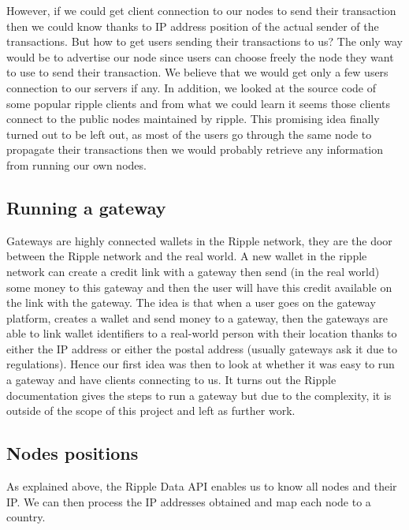 However, if we could get client connection to our nodes to send their transaction then we could know thanks to IP address position of the actual sender of the transactions. But how to get users sending their transactions to us? The only way would be to advertise our node since users can choose freely the node they want to use to send their transaction. We believe that we would get only a few users connection to our servers if any. In addition, we looked at the source code of some popular ripple clients and from what we could learn it seems those clients connect to the public nodes maintained by ripple. This promising idea finally turned out to be left out, as most of the users go through the same node to propagate their transactions then we would probably retrieve any information from running our own nodes.

\subsection{Running a gateway}
Gateways are highly connected wallets in the Ripple network, they are the door between the Ripple network and the real world. A new wallet in the ripple network can create a credit link with a gateway then send (in the real world) some money to this gateway and then the user will have this credit available on the link with the gateway. The idea is that when a user goes on the gateway platform, creates a wallet and send money to a gateway, then the gateways are able to link wallet identifiers to a real-world person with their location thanks to either the IP address or either the postal address (usually gateways ask it due to regulations). Hence our first idea was then to look at whether it was easy to run a gateway and have clients connecting to us. It turns out the Ripple documentation\cite{runGateway} gives the steps to run a gateway but due to the complexity, it is outside of the scope of this project and left as further work.

\subsection{Nodes positions}
As explained above, the Ripple Data API\cite{data-api} enables us to know all nodes and their IP. We can then process the IP addresses obtained and map each node to a country.

